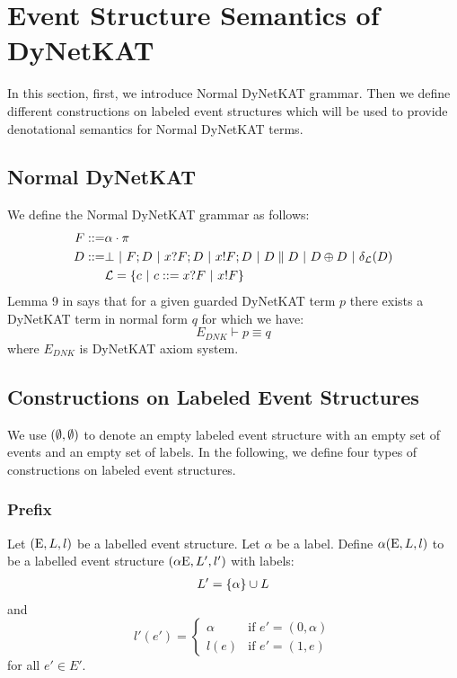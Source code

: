 \section{Event Structure Semantics of DyNetKAT}
In this section, first, we introduce Normal DyNetKAT grammar.
Then we define different constructions on labeled event structures
which will be used to provide denotational semantics for Normal
DyNetKAT terms.

\subsection{Normal DyNetKAT}
We define the Normal DyNetKAT grammar as follows:
\begin{align*}
    F ::= & \alpha\cdot\pi                                                                           \\
    D ::= & \bot ~|~ F;D ~|~ x?F;D ~|~ x!F;D ~|~ D \parallel D ~|~ D \oplus D ~|~ \delta_{\mathcal{L}}(D) \\
          & \mathcal{L} = \{c ~|~ c ::= x?F ~|~ x!F\}
\end{align*}
Lemma 9 in \cite{dynetkat} says that for a given guarded DyNetKAT term
$p$ there exists a DyNetKAT term in normal form $q$ for which we have:
\begin{equation*}
    E_{DNK} \vdash p \equiv q
\end{equation*}
where $E_{DNK}$ is DyNetKAT axiom system.

\subsection{Constructions on Labeled Event Structures \cite{es}}
We use $(\emptyset,\emptyset)$ to denote an empty labeled event structure with
an empty set of events and an empty set of labels.
In the following, we define four types of constructions on labeled 
event structures.

\subsubsection{Prefix}

\begin{definition}
    Let $(\mathrm{E},L,l)$ be a labelled event structure.
    Let $\alpha$ be a label.
    Define $\alpha(\mathrm{E},L,l)$ to be a labelled event structure 
    $(\alpha \mathrm{E},L',l')$
    with labels:
    \begin{align*}
        L' = \{\alpha\} \cup L
    \end{align*}
    and
    $$
        l'(e') = \begin{cases}
            \alpha & \text{if } e' = (0,\alpha) \\
            l(e)   & \text{if } e' = (1,e)
        \end{cases}
    $$
    for all $e' \in E'$.
\end{definition}


